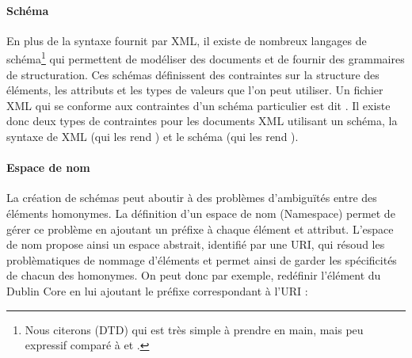 


\paragraph{Schéma}
En plus de la syntaxe fournit par XML, il existe de nombreux langages de schéma\footnote{Nous citerons  (DTD) qui est très simple à prendre en main, mais peu expressif comparé à  et .} qui permettent de modéliser des documents et de fournir des grammaires de structuration.
Ces schémas définissent des contraintes sur la structure des éléments, les attributs et les types de valeurs que l'on peut utiliser.
Un fichier XML qui se conforme aux contraintes d'un schéma particulier est dit .
Il existe donc deux types de contraintes pour les documents XML utilisant un schéma, la syntaxe de XML (qui les rend ) et le schéma (qui les rend ).



\paragraph{Espace de nom}
La création de schémas peut aboutir à des problèmes d'ambiguïtés entre des éléments homonymes. 
La définition d'un espace de nom (Namespace) permet de gérer ce problème en ajoutant un préfixe à chaque élément et attribut.
L'espace de nom propose ainsi un espace abstrait, identifié par une URI, qui résoud les problèmatiques de nommage d'éléments et permet ainsi de garder les spécificités de chacun des homonymes. 
On peut donc par exemple, redéfinir l'élément  du Dublin Core en lui ajoutant le préfixe  correspondant à l'URI  : 

